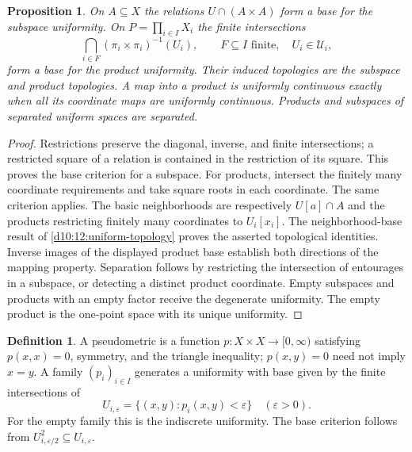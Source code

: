\documentclass[11pt,oneside,openany]{book}
\newtheorem{proposition}[theorem]{Proposition}
\theoremstyle{definition}
\newtheorem{definition}[theorem]{Definition}
\theoremstyle{remark}
\newcommand{\eps}{\varepsilon}
\begin{document}
\begin{proposition}\label{d10:12:subspace-product}
On $A\subseteq X$ the relations $U\cap(A\times A)$ form a base for the subspace uniformity. On $P=\prod_{i\in I}X_i$ the finite intersections
\[
 \bigcap_{i\in F}(\pi_i\times\pi_i)^{-1}(U_i),\qquad F\subseteq I\text{ finite},\quad U_i\in\mathcal U_i,
\]
form a base for the product uniformity. Their induced topologies are the subspace and product topologies. A map into a product is uniformly continuous exactly when all its coordinate maps are uniformly continuous. Products and subspaces of separated uniform spaces are separated.
\end{proposition}
\begin{proof}
Restrictions preserve the diagonal, inverse, and finite intersections; a restricted square of a relation is contained in the restriction of its square. This proves the base criterion for a subspace. For products, intersect the finitely many coordinate requirements and take square roots in each coordinate. The same criterion applies. The basic neighborhoods are respectively $U[a]\cap A$ and the products restricting finitely many coordinates to $U_i[x_i]$. The neighborhood-base result of \cref{d10:12:uniform-topology} proves the asserted topological identities. Inverse images of the displayed product base establish both directions of the mapping property. Separation follows by restricting the intersection of entourages in a subspace, or detecting a distinct product coordinate. Empty subspaces and products with an empty factor receive the degenerate uniformity. The empty product is the one-point space with its unique uniformity.
\end{proof}

\begin{definition}\label{d10:12:pseudometric}
A pseudometric is a function $p:X\times X\to[0,\infty)$ satisfying $p(x,x)=0$, symmetry, and the triangle inequality; $p(x,y)=0$ need not imply $x=y$. A family $(p_i)_{i\in I}$ generates a uniformity with base given by the finite intersections of
\[
 U_{i,\eps}=\{(x,y):p_i(x,y)<\eps\}\quad(\eps>0).
\]
For the empty family this is the indiscrete uniformity. The base criterion follows from $U_{i,\eps/2}^2\subseteq U_{i,\eps}$.
\end{definition}
\end{document}
